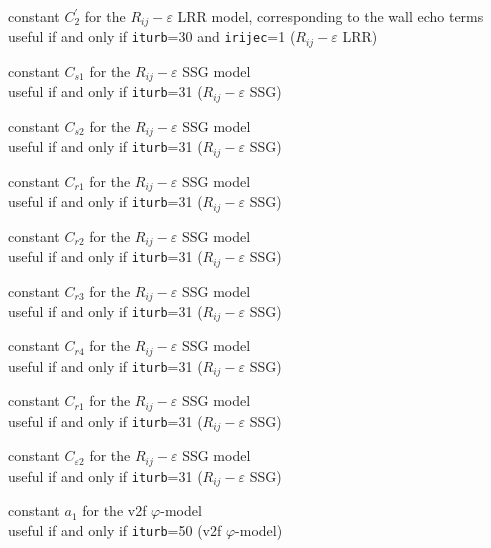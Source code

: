 {constant $C_2^\prime$ for the $R_{ij}-\varepsilon$ LRR model, corresponding to
the wall echo terms\\
useful if and only if {\tt iturb}=30 and {\tt irijec}=1
($R_{ij}-\varepsilon$ LRR)}


{constant $C_{s1}$ for the $R_{ij}-\varepsilon$ SSG model\\
useful if and only if {\tt iturb}=31
($R_{ij}-\varepsilon$ SSG)}

{constant $C_{s2}$ for the $R_{ij}-\varepsilon$ SSG model\\
useful if and only if {\tt iturb}=31
($R_{ij}-\varepsilon$ SSG)}

{constant $C_{r1}$ for the $R_{ij}-\varepsilon$ SSG model\\
useful if and only if {\tt iturb}=31
($R_{ij}-\varepsilon$ SSG)}

{constant $C_{r2}$ for the $R_{ij}-\varepsilon$ SSG model\\
useful if and only if {\tt iturb}=31
($R_{ij}-\varepsilon$ SSG)}

{constant $C_{r3}$ for the $R_{ij}-\varepsilon$ SSG model\\
useful if and only if {\tt iturb}=31
($R_{ij}-\varepsilon$ SSG)}

{constant $C_{r4}$ for the $R_{ij}-\varepsilon$ SSG model\\
useful if and only if {\tt iturb}=31
($R_{ij}-\varepsilon$ SSG)}

{constant $C_{r1}$ for the $R_{ij}-\varepsilon$ SSG model\\
useful if and only if {\tt iturb}=31
($R_{ij}-\varepsilon$ SSG)}

{constant $C_{\varepsilon 2}$ for the $R_{ij}-\varepsilon$ SSG model\\
useful if and only if {\tt iturb}=31
($R_{ij}-\varepsilon$ SSG)}


{constant $a_1$ for the v2f $\varphi$-model\\
useful if and only if {\tt iturb}=50
(v2f $\varphi$-model)}

